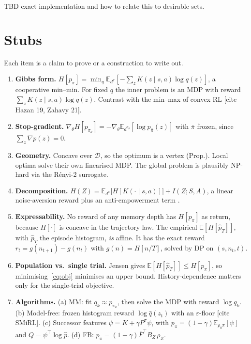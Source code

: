 \documentclass[11pt]{article}
\theoremstyle{remark}
\newcommand{\Dcal}{\mathcal D}
\newcommand{\E}{\mathbb E}
\newcommand{\1}{\mathds{1}}
\newcommand{\occ}{d^{\pi}}
\newcommand{\pz}{p_{\pi}}
\newcommand{\Hf}[1]{H\!\left[#1\right]}
\newcommand{\todo}[1]{\textcolor{red!70!black}{[#1]}}
\begin{document}
TBD exact implementation and how to relate this to desirable sets.


\section{Stubs}

Each item is a claim to prove or a construction to write out.

\begin{enumerate}[leftmargin=*,itemsep=2pt]
  \item \textbf{Gibbs form.}
    $\Hf{\pz}=\min_q\E_{\occ}[-\sum_zK(z\mid s,a)\log q(z)]$, a cooperative min--min.
    For fixed $q$ the inner problem is an MDP with reward $\sum_zK(z\mid s,a)\log q(z)$.
    Contrast with the min--max of convex RL \todo{cite Hazan 19, Zahavy 21}.
  \item \textbf{Stop-gradient.}
    $\nabla_\theta \Hf{p_{\pi_\theta}}=-\nabla_\theta\E_{d^{\pi_\theta}}[\log p_{\bar\pi}(z)]$ with $\bar\pi$ frozen, since $\sum_z\nabla p(z)=0$.
  \item \textbf{Geometry.}
    Concave over $\Dcal$, so the optimum is a vertex (Prop.).
    Local optima solve their own linearised MDP.
    The global problem is plausibly NP-hard via the R\'enyi-2 surrogate.
  \item \textbf{Decomposition.}
    $H(Z)=\E_{\occ}\big[\Hf{K(\cdot\mid s,a)}\big]+I(Z;S,A)$, a linear noise-aversion reward plus an anti-empowerment term \citep{Klyubin-empowerment05}.
  \item \textbf{Expressability.}
    No reward of any memory depth has $\Hf{\pz}$ as return, because $\Hf{\cdot}$ is concave in the trajectory law.
    The empirical $\E[\Hf{\hat p_T}]$, with $\hat p_T$ the episode histogram, \emph{is} affine.
    It has the exact reward $r_t=g(n_{t+1})-g(n_t)$ with $g(n)=\Hf{n/T}$, solved by DP on $(s,n_t,t)$.
  \item \textbf{Population vs.\ single trial.}
    Jensen gives $\E[\Hf{\hat p_T}]\le \Hf{\pz}$, so minimising~\eqref{eq:obj} minimises an upper bound.
    History-dependence matters only for the single-trial objective.
  \item \textbf{Algorithms.}
    (a) MM: fit $q_k\approx p_{\pi_k}$, then solve the MDP with reward $\log q_k$.
    (b) Model-free: frozen histogram reward $\log\hat q(z_t)$ with an $\varepsilon$-floor \todo{cite SMiRL}.
    (c) Successor features $\psi=K+\gamma P^\pi\psi$, with $\pz=(1-\gamma)\E_{\rho_0\pi}[\psi]$ and $Q=\psi^\top\log\hat p$.
    (d) FB: $\pz=(1-\gamma)\bar F^\top B_Z\,\rho_Z$.

\end{enumerate}
\end{document}
